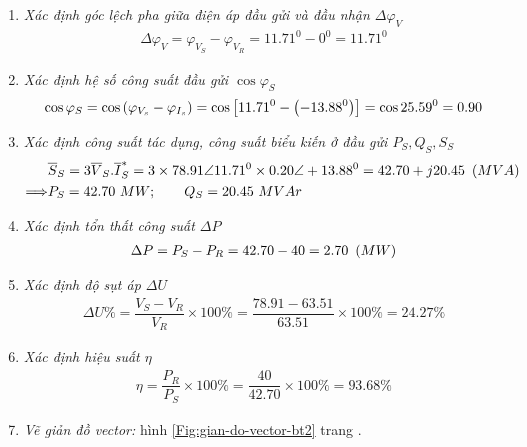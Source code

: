 \begin{enumerate}
\begin{enumerate}[\it a.]
				\item \emph{Xác định góc lệch pha giữa điện áp đầu gửi và đầu nhận $\Delta \varphi_V$}
						\begin{align*}
							\Delta \varphi_V = \varphi_{V_S} - \varphi_{V_R} = 11.71^0 - 0^0= 11.71^0
						\end{align*}
					
				\item \emph{Xác định hệ số công suất đầu gửi $\cos \varphi_S$}
					\begin{align*}
						\cos \varphi_S  = \cos \left({\varphi_{V_s} - \varphi_{I_{s}}}\right)= \cos \left[{11.71^0 - \left({-13.88^0}\right)} \right] = \cos 25.59^0 = 0.90
					\end{align*}					
				
				\item \emph{Xác định công suất tác dụng, công suất biểu kiến ở đầu gửi $P_S, Q_S, S_S$}
					\begin{align*}
						& \overline{S}_S  = 3 \overline{V}_S.\overline{I}_S^{\ast} = 3 \times 78.91 \angle 11.71^0 \times 0.20 \angle +13.88^0 =  42.70+ j20.45 ~\left({MVA}\right)\\
						\Longrightarrow & P_S  = 42.70 ~MW; \qquad Q_S = 20.45 ~MVAr
					\end{align*}						
			
				\item \emph{Xác định tổn thất công suất $\Delta P$}
					\begin{align*}
						\Delta P = P_S - P_R = 42.70 - 40 = 2.70 ~\left({MW}\right)
					\end{align*}				
				
				\item \emph{Xác định độ sụt áp $\Delta U$}
					\begin{align*}
						\Delta U \%= \dfrac{V_S - V_R}{V_R} \times 100 \% = \dfrac{78.91 - 63.51}{63.51} \times 100 \% = 24.27\%
					\end{align*}		
				
				\item \emph{Xác định hiệu suất $\eta$}
						\begin{align*}
							\eta = \dfrac{P_R}{P_S} \times 100 \% = \dfrac{40}{42.70} \times 100\% = 93.68\%
						\end{align*}
						
				\item \emph{Vẽ giản đồ vector:} hình \ref{Fig:gian-do-vector-bt2} trang \pageref{Fig:gian-do-vector-bt2}.				
			\end{enumerate}
			

\end{enumerate}
